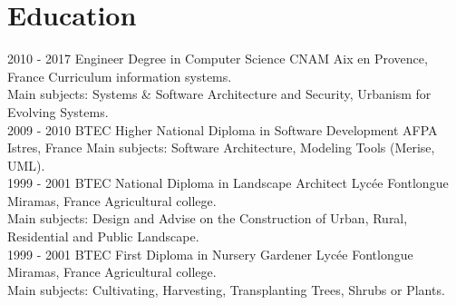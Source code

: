 \documentclass[]{friggeri-cv}
\begin{document}
\section{Education}
\begin{entrylist}
  \entry
    {2010 - 2017}
    {Engineer Degree in Computer Science}
    {CNAM Aix en Provence, France}
    {Curriculum information systems.\\
    Main subjects: Systems \& Software Architecture and Security, Urbanism for Evolving Systems.\\}
  \entry
    {2009 - 2010}
    {BTEC Higher National Diploma in Software Development}
    {AFPA Istres, France}
    {Main subjects: Software Architecture, Modeling Tools (Merise, UML).\\}
  \entry
    {1999 - 2001}
    {BTEC National Diploma in Landscape Architect}
    {Lycée Fontlongue Miramas, France}
    {Agricultural college.\\
    Main subjects: Design and Advise on the Construction of Urban, Rural, Residential and Public Landscape.\\}
  \entry
    {1999 - 2001}
    {BTEC First Diploma in Nursery Gardener}
    {Lycée Fontlongue Miramas, France}
    {Agricultural college.\\
    Main subjects: Cultivating, Harvesting, Transplanting Trees, Shrubs or Plants.}
\end{entrylist}

\newpage
\end{document}
